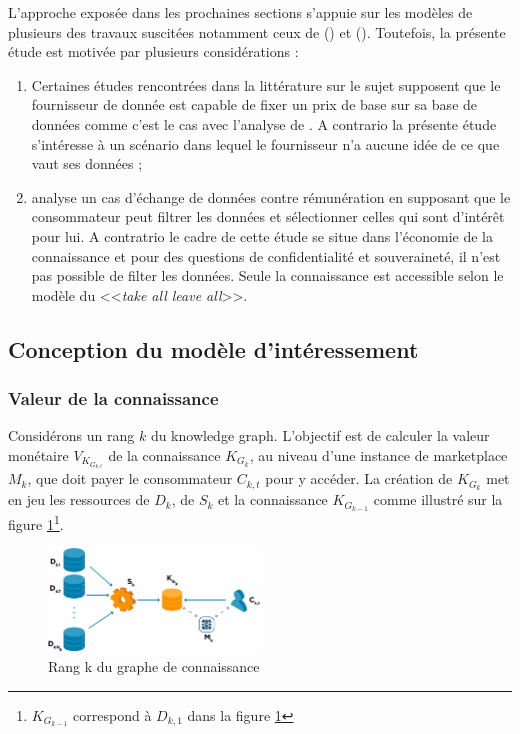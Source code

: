 L'approche exposée dans les prochaines sections s'appuie sur les modèles de plusieurs des travaux suscitées notamment ceux de \citeauthor{mehta_how_nodate} (\citeyear{mehta_how_nodate}) et \citeauthor{agarwal_marketplace_2019} (\citeyear{agarwal_marketplace_2019}). Toutefois, la présente étude est motivée par plusieurs considérations :

\begin{enumerate}
    \item Certaines études rencontrées dans la littérature sur le sujet supposent que le fournisseur de donnée est capable de fixer un prix de base sur sa base de données comme c'est le cas avec l'analyse de \citeauthor{deep_qirana_2017}. A contrario la présente étude s'intéresse à un scénario dans lequel le fournisseur n'a aucune idée de ce que vaut ses données ;
    \item \citeauthor{mehta_how_nodate} analyse un cas d'échange de données contre rémunération en supposant que le consommateur peut filtrer les données et sélectionner celles qui sont d'intérêt pour lui. A contratrio le cadre de cette étude se situe dans l'économie de la connaissance et pour des questions de confidentialité et souveraineté, il n'est pas possible de filter les données. Seule la connaissance est accessible selon le modèle du <<\textit{take all leave all}>>. 
\end{enumerate}

\subsection{Conception du modèle d'intéressement}\label{subsec:conc_mod_int}


\subsubsection{Valeur de la connaissance} \label{subsubsec:kg_value}

Considérons un rang $k$ du knowledge graph. L'objectif est de calculer la valeur monétaire $V_{K_{G_{k,t}}}$ de la connaissance $K_{G_k}$, au niveau d'une instance de marketplace $M_k$, que doit payer le consommateur $C_{k,t}$ pour y accéder. La création de $K_{G_k}$ met en jeu les ressources de $D_k$, de $S_k$ et la connaissance $K_{G_{k-1}}$ comme illustré sur la figure \ref{fig:market_place_vkg}\footnote{$K_{G_{k-1}}$ correspond à $D_{k,1}$ dans la figure \ref{fig:market_place_vkg}}.

\begin{figure}[h]
    \centering
    \includegraphics[width=0.5\textwidth]{ILLUSTRATIONS/kg_graph_kk_update_1.png}
    \caption{Rang k du graphe de connaissance}
    \label{fig:market_place_vkg}
\end{figure}

